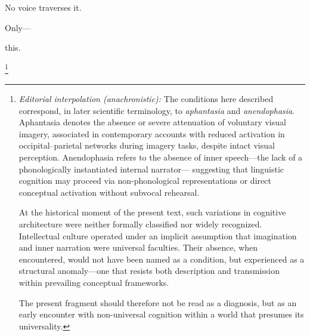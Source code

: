 No voice traverses it.

\medskip

Only---

\medskip

this.

\footnote{\footnotesize
\textit{Editorial interpolation (anachronistic):} The conditions here
described correspond, in later scientific terminology, to \emph{aphantasia}
and \emph{anendophasia}. Aphantasia denotes the absence or severe
attenuation of voluntary visual imagery, associated in contemporary accounts
with reduced activation in occipital--parietal networks during imagery tasks,
despite intact visual perception. Anendophasia refers to the absence of inner
speech---the lack of a phonologically instantiated internal narrator---
suggesting that linguistic cognition may proceed via non-phonological
representations or direct conceptual activation without subvocal rehearsal.

At the historical moment of the present text, such variations in cognitive
architecture were neither formally classified nor widely recognized.
Intellectual culture operated under an implicit assumption that imagination
and inner narration were universal faculties. Their absence, when encountered,
would not have been named as a condition, but experienced as a structural
anomaly---one that resists both description and transmission within prevailing
conceptual frameworks.

The present fragment should therefore not be read as a diagnosis, but as an
early encounter with non-universal cognition within a world that presumes
its universality.}
